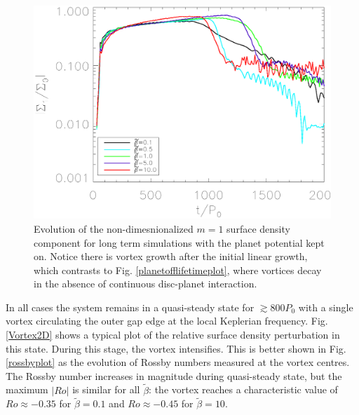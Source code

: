 \begin{figure}
  \includegraphics[width=\linewidth,clip=true,trim=0.5cm
  0cm 0cm 1cm]{figures/longterm_stability}
  \caption{Evolution of the non-dimesnionalized $m=1$ surface density component
    for long term
    simulations with the planet potential kept on. Notice there is
    vortex growth after the initial linear growth, which
    contrasts to Fig. \ref{planetofflifetimeplot}, where vortices
    decay in the absence of continuous disc-planet interaction. 
    \label{lifetimeplot}}   
\end{figure}

In all cases the system remains in a quasi-steady state for
$\gtrsim800P_0$ with a single vortex circulating 
the outer gap edge at the local Keplerian  
frequency. 
Fig. \ref{Vortex2D} shows a typical plot of the relative 
surface density perturbation in this state. During this stage, the 
vortex intensifies. This is better shown in Fig. \ref{rossbyplot} as the
evolution of Rossby numbers measured at the vortex centres.  
The Rossby number increases in magnitude during quasi-steady state,
but the maximum $|Ro|$ is similar for all $\tilde{\beta}$: the vortex
reaches a characteristic value of $Ro\approx-0.35$ for 
$\tilde\beta=0.1$ and $Ro\approx -0.45$ for $\tilde\beta=10$.    


